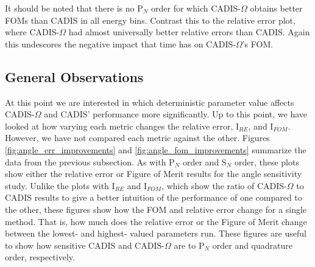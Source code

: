 It should be
noted that there is no P$_N$ order for which CADIS-$\Omega$ obtains better FOMs
than CADIS in all energy bins. Contrast this to the relative error plot, where
CADIS-$\Omega$ had almost universally better relative errors than CADIS. Again
this undescores the negative impact that time has on CADIS-$\Omega$'s FOM.

%
%
%
%
%
%
%

\subsection{General Observations}
\label{subsec:observations}

At this point we are interested in which deterministic parameter value affects
CADIS-$\Omega$ and CADIS' performance more significantly. Up to this point, we
have looked at how varying each metric changes the relative error, I$_{RE}$, and
I$_{FOM}$. However, we have not compared each metric against the other.
Figures \ref{fig:angle_err_improvements} and \ref{fig:angle_fom_improvements}
summarize the data from the previous subsection. As with P$_N$ order and S$_N$
order, these plots show either the relative error or Figure of Merit results for
the angle sensitivity study. Unlike the plots with I$_{RE}$ and I$_{FOM}$, which
show the ratio of CADIS-$\Omega$ to CADIS results to give a better intuition of
the performance of one compared to the other, these
figures show how the FOM and relative error change for a single method. That is,
how much does the relative error or the Figure of Merit change between the lowest-
and highest- valued parameters run. These figures are useful to show how
sensitive CADIS and CADIS-$\Omega$ are to P$_N$ order and quadrature order,
respectively.

